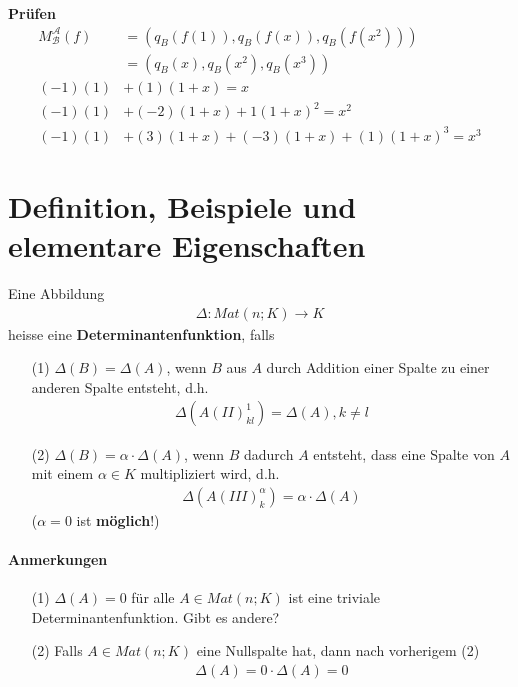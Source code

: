\documentclass[11pt]{report}
\newcommand*\f[1] {\textbf{#1}}
\begin{document}
\begin{itemize}
\f{Prüfen}
\begin{align}
M_{\mathcal{B}}^{\mathcal{A}} (f) &=  (q_B(f(1)), q_B(f(x)), q_B(f(x^2))) \\
 &= (q_B(x), q_B(x^2), q_B(x^3)) \\
(-1)(1) &+ (1)(1+x) = x \\
(-1)(1) &+ (-2)(1+x) + 1(1+x)^2 = x^2 \\
(-1)(1) &+ (3)(1+x) + (-3)(1+x) +(1)(1+x)^3 = x^3
\end{align}
\end{itemize}


\section{Definition, Beispiele und elementare Eigenschaften}
Eine Abbildung
\begin{align}
\Delta : Mat(n;K) \rightarrow K
\end{align}
heisse eine \f{Determinantenfunktion}, falls
\begin{itemize}
 \item[(1)] $\Delta(B) = \Delta(A)$, wenn $B$ aus $A$ durch Addition einer Spalte zu einer anderen Spalte entsteht, d.h.
\begin{align}
\Delta(A(II)_{kl}^{1}) = \Delta(A), k \neq l
\end{align}

 \item[(2)] $\Delta(B) = \alpha \cdot \Delta(A)$, wenn $B$ dadurch $A$ entsteht, dass eine Spalte von $A$ mit einem $\alpha \in K$ multipliziert wird, d.h.
\begin{align}
\Delta(A(III)_{k}^{\alpha}) = \alpha \cdot \Delta(A)
\end{align}
($\alpha = 0$ ist \f{möglich}!)
\end{itemize}

\paragraph{Anmerkungen}
\begin{itemize}
 \item[(1)] $\Delta(A) = 0$ für alle $A \in Mat(n;K)$ ist eine triviale Determinantenfunktion. Gibt es andere?
 \item[(2)] Falls $A \in Mat(n;K)$ eine Nullspalte hat, dann nach vorherigem (2)
\begin{align}
\Delta(A) = 0 \cdot \Delta(A) = 0
\end{align}
\end{itemize}
\end{document}
